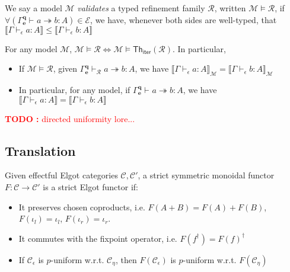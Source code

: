 \documentclass[acmsmall,screen,review]{acmart}
\newcounter{todos}
\newcommand{\TODO}[1]{{
  \stepcounter{todos}
  \begin{center}\large{\textcolor{red}{\textbf{TODO \arabic{todos}:} #1}}\end{center}
}}
\newcommand{\mc}[1]{\ensuremath{\mathcal{#1}}}
\newcommand{\mb}[1]{\ensuremath{\mathbf{#1}}}
\newcommand{\ms}[1]{\ensuremath{\mathsf{#1}}}
\newcommand{\hasty}[4]{#1 \vdash_{#2} #3: {#4}}
\newcommand{\tref}{\twoheadrightarrow}
\newcommand{\tmle}[5]{#1 \vdash_{#2} #3 \tref #4 : {#5}}
\newcommand{\dnt}[1]{\llbracket{#1}\rrbracket}
\newcommand{\thsubiter}[1]{\ms{Th}_{\ms{iter}}(#1)}
\begin{document}
\begin{definition}
  We say a model $\mc{M}$ \emph{validates} a typed refinement family $\mc{R}$, written $\mc{M}
  \models \mc{R}$, if
  $
  \forall (\tmle{\Gamma^{\mb{q}}_{\mb{e}}}{}{a}{b}{A}) \in \mc{E}
  $, we have, whenever both sides are well-typed, that
  $
  \dnt{\hasty{\Gamma}{\epsilon}{a}{A}} \leq \dnt{\hasty{\Gamma}{\epsilon}{b}{A}}
  $
\end{definition}

\begin{theorem}[name=Soundness, restate=soundnessiter]
  For any model $\mc{M}$, $\mc{M} \models \mc{R} \iff \mc{M} \models \thsubiter{\mc{R}}$. In
  particular,
  \begin{itemize}
    \item If $\mc{M} \models \mc{R}$, given $\tmle{\Gamma^{\mb{q}}_{\mb{e}}}{\mc{R}}{a}{b}{A}$, we
    have $\dnt{\hasty{\Gamma}{\epsilon}{a}{A}}_{\mc{M}} =
    \dnt{\hasty{\Gamma}{\epsilon}{b}{A}}_{\mc{M}}$
    \item In particular, for any model, if $\tmle{\Gamma^{\mb{q}}_{\mb{e}}}{}{a}{b}{A}$, we have
    $\dnt{\hasty{\Gamma}{\epsilon}{a}{A}} = \dnt{\hasty{\Gamma}{\epsilon}{b}{A}}$
  \end{itemize}
\end{theorem}

\TODO{directed uniformity lore...}


\subsection{Translation}

\begin{definition}
  Given effectful Elgot categories $\mc{C}, \mc{C}'$, a strict symmetric monoidal functor $F :
  \mc{C} \to \mc{C}'$ is a strict Elgot functor if:
  \begin{itemize}
    \item It preserves chosen coproducts, i.e. $F(A + B) = F(A) + F(B)$, $F(\iota_l) = \iota_l$,
    $F(\iota_r) = \iota_r$.
    \item It commutes with the fixpoint operator, i.e. $F(f^\dagger) = F(f)^\dagger$
    \item If $\mc{C}_\epsilon$ is $p$-uniform w.r.t. $\mc{C}_\eta$, then $F(\mc{C}_\epsilon)$ is
    $p$-uniform w.r.t. $F(\mc{C}_\eta)$
  \end{itemize}
\end{definition}
\end{document}
